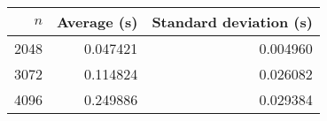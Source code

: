 \begin{tabular}{rrr}
$n$ & Average (s) & Standard deviation (s)\\\hline
2048 & 0.047421 & 0.004960\\
3072 & 0.114824 & 0.026082\\
4096 & 0.249886 & 0.029384\\
\end{tabular}
